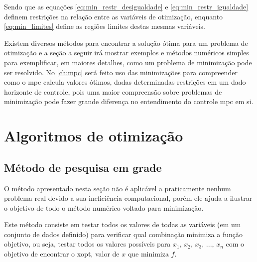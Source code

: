 Sendo que as equações \ref{eq:min_restr_desigualdade} e \ref{eq:min_restr_igualdade}
definem restrições na relação entre as variáveis de otimização, enquanto
\ref{eq:min_limites} define as regiões limites destas mesmas variáveis.

Existem diversos métodos para encontrar a solução ótima para um problema de otimização
e a seção a seguir irá mostrar exemplos e métodos numéricos simples para exemplificar,
em maiores detalhes, como um problema de minimização pode ser resolvido. No
\cref{ch:mpc} será feito uso das minimizações para compreender como o \acrshort{mpc}
calcula valores ótimos, dadas determinadas restrições em um dado horizonte de controle,
pois uma maior compreensão sobre problemas de minimização pode fazer grande diferença
no entendimento do controle \acrshort{mpc} em si.

\section{Algoritmos de otimização}
\label{sec:algoritmos_de_otimizacao}

\subsection{Método de pesquisa em grade}
\label{subsec:metodo_pesquisa_em_grade}

O método apresentado nesta seção não é aplicável a praticamente nenhum problema real
devido a sua ineficiência computacional, porém ele ajuda a ilustrar o objetivo de
todo o método numérico voltado para minimização.

Este método consiste em testar todos os valores de todas as variáveis (em um conjunto
de dados definido) para verificar qual combinação minimiza a função objetivo, ou seja,
testar todos os valores possíveis para $x_1$, $x_2$, $x_3$, $...$, $x_n$ com o
objetivo de encontrar o \gls{xopt}, valor de $x$ que minimiza $f$.


